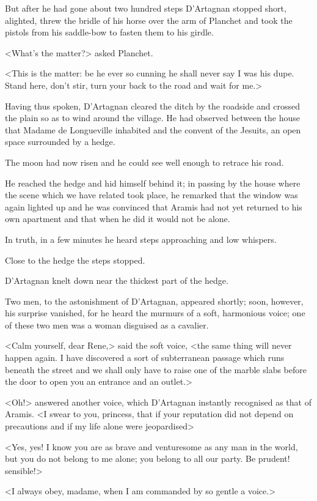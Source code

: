 But after he had gone about two hundred steps D'Artagnan stopped short, alighted, threw the bridle of his horse over the arm of Planchet and took the pistols from his saddle-bow to fasten them to his girdle.

<What's the matter?> asked Planchet.

<This is the matter: be he ever so cunning he shall never say I was his dupe. Stand here, don't stir, turn your back to the road and wait for me.>

Having thus spoken, D'Artagnan cleared the ditch by the roadside and crossed the plain so as to wind around the village. He had observed between the house that Madame de Longueville inhabited and the convent of the Jesuits, an open space surrounded by a hedge.

The moon had now risen and he could see well enough to retrace his road.

He reached the hedge and hid himself behind it; in passing by the house where the scene which we have related took place, he remarked that the window was again lighted up and he was convinced that Aramis had not yet returned to his own apartment and that when he did it would not be alone.

In truth, in a few minutes he heard steps approaching and low whispers.

Close to the hedge the steps stopped.

D'Artagnan knelt down near the thickest part of the hedge.

Two men, to the astonishment of D'Artagnan, appeared shortly; soon, however, his surprise vanished, for he heard the murmurs of a soft, harmonious voice; one of these two men was a woman disguised as a cavalier.

<Calm yourself, dear Rene,> said the soft voice, <the same thing will never happen again. I have discovered a sort of subterranean passage which runs beneath the street and we shall only have to raise one of the marble slabs before the door to open you an entrance and an outlet.>

<Oh!> answered another voice, which D'Artagnan instantly recognised as that of Aramis. <I swear to you, princess, that if your reputation did not depend on precautions and if my life alone were jeopardised\longdash>

<Yes, yes! I know you are as brave and venturesome as any man in the world, but you do not belong to me alone; you belong to all our party. Be prudent! sensible!>

<I always obey, madame, when I am commanded by so gentle a voice.>

